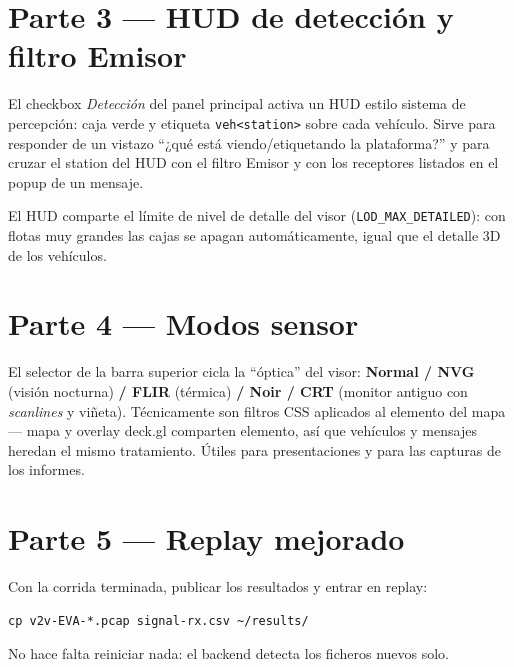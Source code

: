 \documentclass[11pt,a4paper]{article}
\begin{document}
\section{Parte 3 --- HUD de detección y filtro Emisor}

El checkbox \emph{Detección} del panel principal activa un HUD estilo sistema
de percepción: caja verde y etiqueta \texttt{veh<station>} sobre cada
vehículo. Sirve para responder de un vistazo ``¿qué está viendo/etiquetando la
plataforma?'' y para cruzar el station del HUD con el filtro Emisor y con los
receptores listados en el popup de un mensaje.

\begin{notabox}
El HUD comparte el límite de nivel de detalle del visor
(\texttt{LOD\_MAX\_DETAILED}): con flotas muy grandes las cajas se apagan
automáticamente, igual que el detalle 3D de los vehículos.
\end{notabox}

\section{Parte 4 --- Modos sensor}

El selector de la barra superior cicla la ``óptica'' del visor:
\textbf{Normal / NVG} (visión nocturna) \textbf{/ FLIR} (térmica)
\textbf{/ Noir / CRT} (monitor antiguo con \emph{scanlines} y viñeta).
Técnicamente son filtros CSS aplicados al elemento del mapa --- mapa y overlay
deck.gl comparten elemento, así que vehículos y mensajes heredan el mismo
tratamiento. Útiles para presentaciones y para las capturas de los informes.

\section{Parte 5 --- Replay mejorado}

Con la corrida terminada, publicar los resultados y entrar en replay:

\begin{encontenedor}
\begin{lstlisting}
cp v2v-EVA-*.pcap signal-rx.csv ~/results/
\end{lstlisting}
No hace falta reiniciar nada: el backend detecta los ficheros nuevos solo.
\end{encontenedor}
\end{document}
